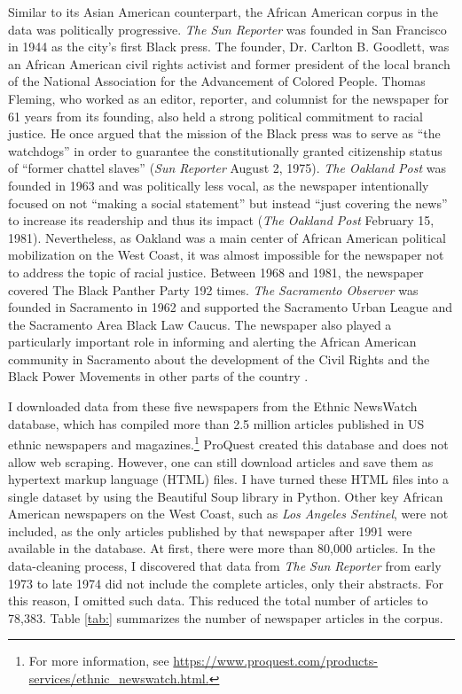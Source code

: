 \documentclass[12 pt]{article}
\begin{document}
Similar to its Asian American counterpart, the African American corpus in the data was politically progressive. \textit{The Sun Reporter} was founded in San Francisco in 1944 as the city's first Black press. The founder, Dr. Carlton B. Goodlett, was an African American civil rights activist and former president of the local branch of the National Association for the Advancement of Colored People. Thomas Fleming, who worked as an editor, reporter, and columnist for the newspaper for 61 years from its founding, also held a strong political commitment to racial justice. He once argued that the mission of the Black press was to serve as “the watchdogs” in order to guarantee the constitutionally granted citizenship status of “former chattel slaves” (\textit{Sun Reporter} August 2, 1975). \textit{The Oakland Post} was founded in 1963 and was politically less vocal, as the newspaper intentionally focused on not “making a social statement” but instead “just covering the news” to increase its readership and thus its impact (\textit{The Oakland Post} February 15, 1981). Nevertheless, as Oakland was a main center of African American political mobilization on the West Coast, it was almost impossible for the newspaper not to address the topic of racial justice. Between 1968 and 1981, the newspaper covered The Black Panther Party 192 times. \textit{The Sacramento Observer} was founded in Sacramento in 1962 and supported the Sacramento Urban League and the Sacramento Area Black Law Caucus. The newspaper also played a particularly important role in informing and alerting the African American community in Sacramento about the development of the Civil Rights and the Black Power Movements in other parts of the country \citep[25]{covin2009black}.

I downloaded data from these five newspapers from the Ethnic NewsWatch database, which has compiled more than 2.5 million articles published in US ethnic newspapers and magazines.\footnote{For more information, see \url{https://www.proquest.com/products-services/ethnic_newswatch.html.}} ProQuest created this database and does not allow web scraping. However, one can still download articles and save them as hypertext markup language (HTML) files. I have turned these HTML files into a single dataset by using the Beautiful Soup library in Python. Other key African American newspapers on the West Coast, such as \textit{Los Angeles Sentinel}, were not included, as the only articles published by that newspaper after 1991 were available in the database. At first, there were more than 80,000 articles. In the data-cleaning process, I discovered that data from \textit{The Sun Reporter} from early 1973 to late 1974 did not include the complete articles, only their abstracts. For this reason, I omitted such data. This reduced the total number of articles to 78,383. Table \ref{tab:} summarizes the number of newspaper articles in the corpus.
\end{document}
